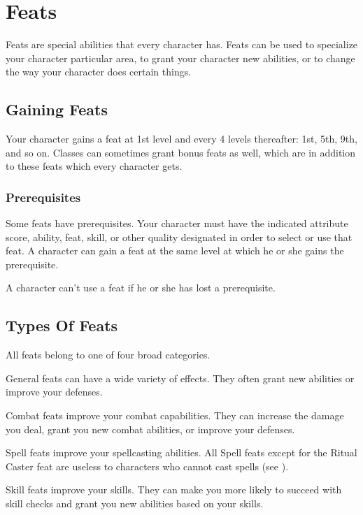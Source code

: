 \chapter{Feats}\label{Feats}

Feats are special abilities that every character has.
Feats can be used to specialize your character particular area, to grant your character new abilities, or to change the way your character does certain things.

\section{Gaining Feats}
    Your character gains a feat at 1st level and every 4 levels thereafter: 1st, 5th, 9th, and so on.
    Classes can sometimes grant bonus feats as well, which are in addition to these feats which every character gets.

    \subsection{Prerequisites}
        Some feats have prerequisites.
        Your character must have the indicated attribute score, ability, feat, skill, or other quality designated in order to select or use that feat.
        A character can gain a feat at the same level at which he or she gains the prerequisite.

        A character can't use a feat if he or she has lost a prerequisite.

\section{Types Of Feats}
    All feats belong to one of four broad categories.

     General feats can have a wide variety of effects.
    They often grant new abilities or improve your defenses.

     Combat feats improve your combat capabilities.
    They can increase the damage you deal, grant you new combat abilities, or improve your defenses.

     Spell feats improve your spellcasting abilities.
    All Spell feats except for the Ritual Caster feat are useless to characters who cannot cast spells (see ).

     Skill feats improve your skills.
    They can make you more likely to succeed with skill checks and grant you new abilities based on your skills.


